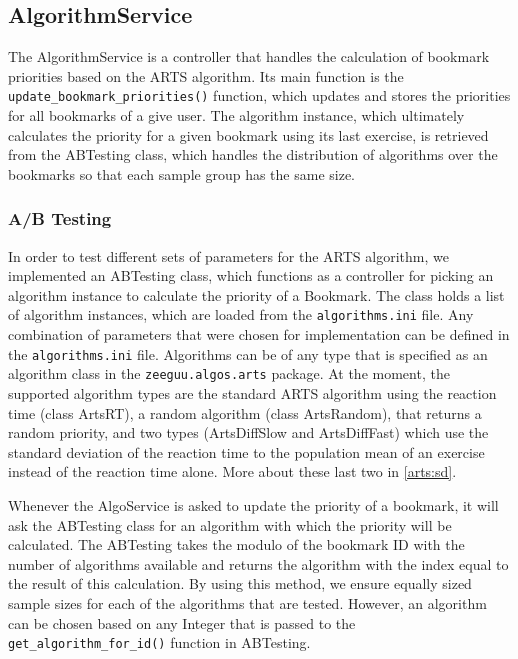 \documentclass{article}
\begin{document}
\subsection{AlgorithmService}
The AlgorithmService is a controller that handles the calculation of bookmark priorities based on the ARTS algorithm. Its main function is the \lstinline|update_bookmark_priorities()| function, which updates and stores the priorities for all bookmarks of a give user. The algorithm instance, which ultimately calculates the priority for a given bookmark using its last exercise, is retrieved from the ABTesting class, which handles the distribution of algorithms over the bookmarks so that each sample group has the same size. 

\subsubsection{A/B Testing}
In order to test different sets of parameters for the ARTS algorithm, we implemented an ABTesting class, which functions as a controller for picking an algorithm instance to calculate the priority of a Bookmark. The class holds a list of algorithm instances, which are loaded from the \lstinline|algorithms.ini| file. Any combination of parameters that were chosen for implementation can be defined in the \lstinline|algorithms.ini| file. Algorithms can be of any type that is specified as an algorithm class in the \lstinline|zeeguu.algos.arts| package. At the moment, the supported algorithm types are the standard ARTS algorithm using the reaction time (class ArtsRT), a random algorithm (class ArtsRandom), that returns a random priority, and two types (ArtsDiffSlow and ArtsDiffFast) which use the standard deviation of the reaction time to the population mean of an exercise instead of the reaction time alone. More about these last two in \autoref{arts:sd}. 

Whenever the AlgoService is asked to update the priority of a bookmark, it will ask the ABTesting class for an algorithm with which the priority will be calculated. The ABTesting takes the modulo of the bookmark ID with the number of algorithms available and returns the algorithm with the index equal to the result of this calculation. By using this method, we ensure equally sized sample sizes for each of the algorithms that are tested. However, an algorithm can be chosen based on any Integer that is passed to the \lstinline|get_algorithm_for_id()| function in ABTesting. 
\end{document}
